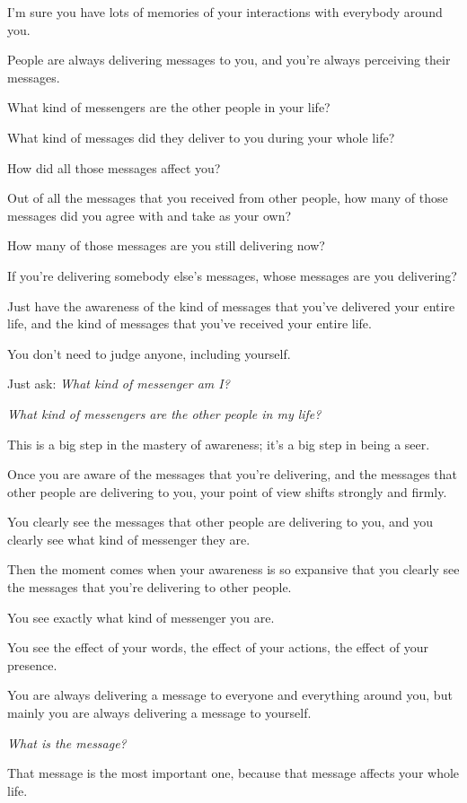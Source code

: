 \documentclass{article}
\numberwithin{equation}{section}
\begin{document}
I'm sure you have lots of memories of your interactions with everybody around you.

People are always delivering messages to you, and you're always perceiving their messages.

What kind of messengers are the other people in your life?

What kind of messages did they deliver to you during your whole life?

How did all those messages affect you?

Out of all the messages that you received from other people, how many of those messages did you agree with and take as your own?

How many of those messages are you still delivering now?

If you're delivering somebody else's messages, whose messages are you delivering?

Just have the awareness of the kind of messages that you've delivered your entire life, and the kind of messages that you've received your entire life.

You don't need to judge anyone, including yourself.

Just ask: \textit{What kind of messenger am I?}

\textit{What kind of messengers are the other people in my life?}

This is a big step in the mastery of awareness; it's a big step in being a seer.

%
Once you are aware of the messages that you're delivering, and the messages that other people are delivering to you, your point of view shifts strongly and firmly.

You clearly see the messages that other people are delivering to you, and you clearly see what kind of messenger they are.

Then the moment comes when your awareness is so expansive that you clearly see the messages that you're delivering to other people.

You see exactly what kind of messenger you are.

You see the effect of your words, the effect of your actions, the effect of your presence.

You are always delivering a message to everyone and everything around you, but mainly you are always delivering a message to yourself.

\textit{What is the message?}

That message is the most important one, because that message affects your whole life.
\end{document}
